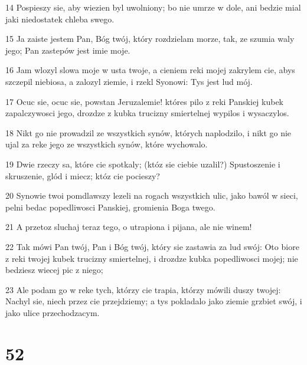 \par 14 Pospieszy sie, aby wiezien byl uwolniony; bo nie umrze w dole, ani bedzie mial jaki niedostatek chleba swego.
\par 15 Ja zaiste jestem Pan, Bóg twój, który rozdzielam morze, tak, ze szumia waly jego; Pan zastepów jest imie moje.
\par 16 Jam wlozyl slowa moje w usta twoje, a cieniem reki mojej zakrylem cie, abys szczepil niebiosa, a zalozyl ziemie, i rzekl Syonowi: Tys jest lud mój.
\par 17 Ocuc sie, ocuc sie, powstan Jeruzalemie! któres pilo z reki Panskiej kubek zapalczywosci jego, drozdze z kubka trucizny smiertelnej wypilos i wysaczylos.
\par 18 Nikt go nie prowadzil ze wszystkich synów, których naplodzilo, i nikt go nie ujal za reke jego ze wszystkich synów, które wychowalo.
\par 19 Dwie rzeczy sa, które cie spotkaly; (któz sie ciebie uzalil?) Spustoszenie i skruszenie, glód i miecz; któz cie pocieszy?
\par 20 Synowie twoi pomdlawszy lezeli na rogach wszystkich ulic, jako bawól w sieci, pelni bedac popedliwosci Panskiej, gromienia Boga twego.
\par 21 A przetoz sluchaj teraz tego, o utrapiona i pijana, ale nie winem!
\par 22 Tak mówi Pan twój, Pan i Bóg twój, który sie zastawia za lud swój: Oto biore z reki twojej kubek trucizny smiertelnej, i drozdze kubka popedliwosci mojej; nie bedziesz wiecej pic z niego;
\par 23 Ale podam go w reke tych, którzy cie trapia, którzy mówili duszy twojej: Nachyl sie, niech przez cie przejdziemy; a tys pokladalo jako ziemie grzbiet swój, i jako ulice przechodzacym.

\chapter{52}

